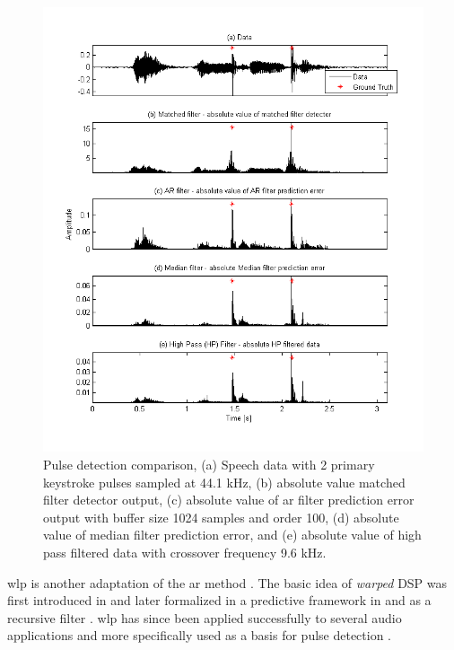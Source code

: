 \begin{figure}[!] %
\centering
\includegraphics[width=130mm]{LitRev_DetectCompare2New.png}
\caption{Pulse detection comparison, (a) Speech data with 2 primary keystroke pulses sampled at 44.1 kHz, (b) absolute value matched filter detector output, (c) absolute value of \gls{ar} filter prediction error output with buffer size 1024 samples and order 100, (d) absolute value of median filter prediction error, and (e) absolute value of high pass filtered data with crossover frequency 9.6 kHz.}
\label{fig:LitRev_DetectCompare2}
\end{figure}

\gls{wlp} is another adaptation of the \gls{ar} method \cite{Esquef2002}. The basic idea of \emph{warped} DSP was first introduced in \cite{Oppenheim1983} and later formalized in a predictive framework in \cite{Strube1980} and as a recursive filter \cite{Steiglitz1980}. \gls{wlp} has since been applied successfully to several audio applications \cite{Karjalainen1997}\cite{Haermae2000} and more specifically used as a basis for pulse detection \cite{Esquef2000}\cite{Esquef2002}.

